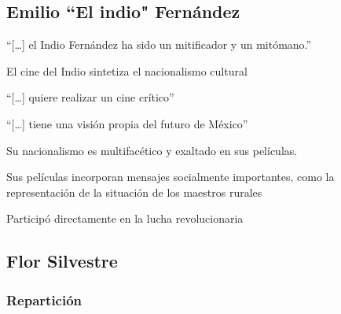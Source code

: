 \subsection{Emilio ``El indio" Fernández}
    \begin{compactitem}
    \item ``[\ldots] el Indio Fernández ha sido un mitificador y un mitómano.''\autocite[445]{cosio_villegas_notas_1976}
    \item El cine del Indio sintetiza el nacionalismo cultural\autocite[444]{cosio_villegas_notas_1976}
    \item ``[\ldots] quiere realizar un cine crítico''\autocite[466]{pablos_escuela_1998-1}
    \item ``[\ldots] tiene una visión propia del futuro de México''\autocite[158]{aguilar_construccion_2014-1}
    \item Su nacionalismo es multifacético y exaltado en sus películas.\autocite[127]{aguilar_construccion_2014-1}
    \item Sus películas incorporan mensajes socialmente importantes, como la representación  de la situación de los maestros rurales\autocite[72]{tierney_myths_2002}
    \item Participó directamente en la lucha revolucionaria  %
    \end{compactitem} 

\subsection{Flor Silvestre}
\subsubsection{Repartición}

